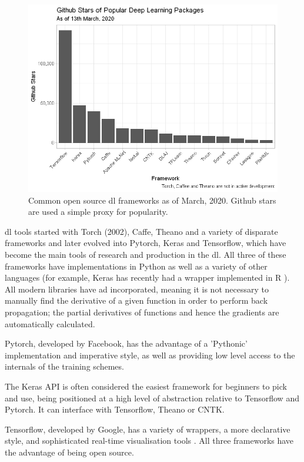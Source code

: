 \begin{figure}
    \centering
    \includegraphics[width=120mm]{figs/gitstars.png}
    \caption[Popular \gls{dl} frameworks]{Common open source \gls{dl} frameworks as of March, 2020. Github stars are used a simple proxy for popularity.}
    \label{fig:git_stars}
\end{figure}

\gls{dl} tools started with Torch (2002), Caffe, Theano and a variety of disparate frameworks and later evolved into Pytorch, Keras and Tensorflow, which have become the main tools of research and production in the \gls{dl}. All three of these frameworks have implementations in Python as well as a variety of other languages (for example, Keras has recently had a wrapper implemented in R \cite{keras_r}). All modern libraries have \gls{ad} incorporated, meaning it is not necessary to manually find the derivative of a given function in order to perform back propagation; the partial derivatives of functions and hence the gradients are automatically calculated.  \bigskip

Pytorch, developed by Facebook, has the advantage of a 'Pythonic' implementation and imperative style, as well as providing low level access to the internals of the training schemes.
\bigskip

The Keras API is often considered the easiest framework for beginners to pick and use, being positioned at a high level of abstraction relative to Tensorflow and Pytorch. It can interface with Tensorflow, Theano or CNTK.  
\bigskip

Tensorflow, developed by Google, has a variety of wrappers, a more declarative style, and sophisticated real-time visualisation tools \cite{tale_dl}. All three frameworks have the advantage of being open source. 
\bigskip

